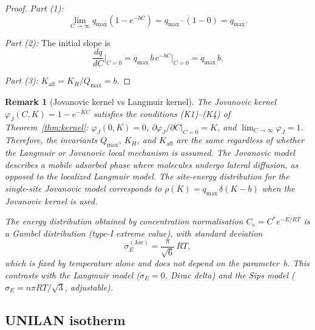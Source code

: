 \documentclass[12pt]{article}
\newtheorem{remark}{Remark}
\begin{document}
\begin{proof}
\textit{Part (1):}
\[
  \lim_{C\to\infty} q_{\max}(1 - e^{-bC}) = q_{\max}\cdot(1 - 0) = q_{\max}.
\]

\textit{Part (2):}  The initial slope is
\[
  \frac{dq}{dC}\bigg|_{C=0}
  = q_{\max}\,b\,e^{-bC}\bigg|_{C=0}
  = q_{\max}\,b.
\]

\textit{Part (3):} $K_{\mathrm{aff}} = K_H / Q_{\max} = b$.
\end{proof}

\begin{remark}[Jovanovic kernel vs Langmuir kernel]
The Jovanovic kernel $\varphi_J(C,K) = 1 - e^{-KC}$ satisfies the
conditions (K1)--(K4) of Theorem~\ref{thm:kernel}: $\varphi_J(0,K)=0$,
$\partial\varphi_J/\partial C|_{C=0} = K$, and
$\lim_{C\to\infty}\varphi_J = 1$.  Therefore, the invariants
$Q_{\max}$, $K_H$, and $K_{\mathrm{aff}}$ are the same regardless of
whether the Langmuir or Jovanovic local mechanism is assumed.
The Jovanovic model describes a mobile adsorbed phase where molecules
undergo lateral diffusion, as opposed to the localized Langmuir model.
The site-energy distribution for the single-site Jovanovic model
corresponds to $\rho(K) = q_{\max}\,\delta(K - b)$ when the Jovanovic
kernel is used.

The energy distribution obtained by concentration normalisation
$C_e = C^* e^{-E/RT}$ is a Gumbel distribution (type-I extreme
value), with standard deviation
\begin{equation}
  \sigma_E^{\mathrm{(Jov)}} = \frac{\pi}{\sqrt{6}}\,RT,
  \label{eq:sigmaE_jov_v5}
\end{equation}
which is fixed by temperature alone and does not depend on the
parameter~$b$.  This contrasts with the Langmuir model
($\sigma_E = 0$, Dirac delta) and the Sips model
($\sigma_E = n\pi RT/\sqrt{3}$, adjustable).
\end{remark}

\subsection{UNILAN isotherm}
\end{document}
